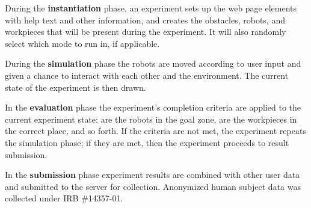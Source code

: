 

During the {\bf instantiation} phase, an experiment sets up the web page elements with help text and other information, and creates the obstacles, robots, and workpieces that will be present during the experiment. It will also randomly select which mode to run in, if applicable.

During the {\bf simulation} phase the robots are moved according to user input and given a chance to interact with each other and the environment. The current state of the experiment is then drawn.

In the {\bf evaluation} phase the experiment's completion criteria are applied to the current experiment state: are the robots in the goal zone, are the workpieces in the correct place, and so forth. If the criteria are not met, the experiment repeats the simulation phase; if they are met, then the experiment proceeds to result submission.

In the {\bf submission} phase experiment results are combined with other user data and submitted to the server for collection.
Anonymized human subject data was collected under IRB \#14357-01.


